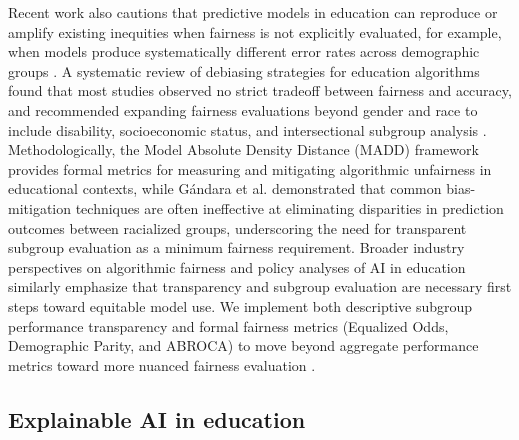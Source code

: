 \documentclass[pdflatex,sn-mathphys-ay]{sn-jnl}
\begin{document}
Recent work also cautions that predictive models in education can reproduce or amplify existing inequities when fairness is not explicitly evaluated, for example, when models produce systematically different error rates across demographic groups \citep{Baker_Hawn_2021,Kizilcec_Lee_2022}. A systematic review of debiasing strategies for education algorithms found that most studies observed no strict tradeoff between fairness and accuracy, and recommended expanding fairness evaluations beyond gender and race to include disability, socioeconomic status, and intersectional subgroup analysis \citep{Idowu_2024_debiasing}. Methodologically, the Model Absolute Density Distance (MADD) framework \citep{Verger_2024_MADD} provides formal metrics for measuring and mitigating algorithmic unfairness in educational contexts, while Gándara et al. \citep{Gandara_2024_blackbox} demonstrated that common bias-mitigation techniques are often ineffective at eliminating disparities in prediction outcomes between racialized groups, underscoring the need for transparent subgroup evaluation as a minimum fairness requirement. Broader industry perspectives on algorithmic fairness \citep{Holstein_2019} and policy analyses of AI in education \citep{Gandara_2025} similarly emphasize that transparency and subgroup evaluation are necessary first steps toward equitable model use. We implement both descriptive subgroup performance transparency and formal fairness metrics (Equalized Odds, Demographic Parity, and ABROCA) to move beyond aggregate performance metrics toward more nuanced fairness evaluation \citep{Li_2025}.

\subsection{Explainable AI in education}
\end{document}
